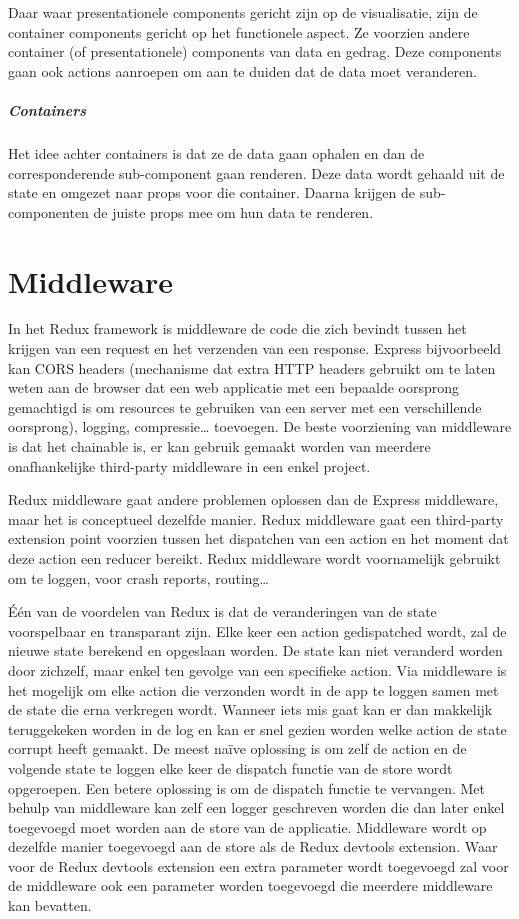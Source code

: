 Daar waar presentationele components gericht zijn op de visualisatie, zijn de container components gericht op het functionele aspect. Ze voorzien andere container (of presentationele) components van data en gedrag. Deze components gaan ook actions aanroepen om aan te duiden dat de data moet veranderen.  
\autocite{prescon}
\autocite{prescon2}

\subparagraph{Containers}
Het idee achter containers is dat ze de data gaan ophalen en dan de corresponderende sub-component gaan renderen. Deze data wordt gehaald uit de state en omgezet naar props voor die container. Daarna krijgen de sub-componenten de juiste props mee om hun data te renderen. 
\autocite{containercomp}

\section{Middleware}
In het Redux framework is middleware de code die zich bevindt tussen het krijgen van een request en het verzenden van een response. Express bijvoorbeeld kan CORS headers (mechanisme dat extra HTTP headers gebruikt om te laten weten aan de browser dat een web applicatie met een bepaalde oorsprong gemachtigd is om resources te gebruiken van een server met een verschillende oorsprong), logging, compressie… toevoegen. De beste voorziening van middleware is dat het chainable is, er kan gebruik gemaakt worden van meerdere onafhankelijke third-party middleware in een enkel project.
 
Redux middleware gaat andere problemen oplossen dan de Express middleware, maar het is conceptueel dezelfde manier. Redux middleware gaat een third-party extension point voorzien tussen het dispatchen van een action en het moment dat deze action een reducer bereikt. Redux middleware wordt voornamelijk gebruikt om te loggen, voor crash reports, routing…

Één van de voordelen van Redux is dat de veranderingen van de state voorspelbaar en transparant zijn. Elke keer een action gedispatched wordt, zal de nieuwe state berekend en opgeslaan worden. De state kan niet veranderd worden door zichzelf, maar enkel ten gevolge van een specifieke action. Via middleware is het mogelijk om elke action die verzonden wordt in de app te loggen samen met de state die erna verkregen wordt. Wanneer iets mis gaat kan er dan makkelijk teruggekeken worden in de log en kan er snel gezien worden welke action de state corrupt heeft gemaakt. De meest naïve oplossing is om zelf de action en de volgende state te loggen elke keer de dispatch functie van de store wordt opgeroepen. Een betere oplossing is om de dispatch functie te vervangen. Met behulp van middleware kan zelf een logger geschreven worden die dan later enkel toegevoegd moet worden aan de store van de applicatie. Middleware wordt op dezelfde manier toegevoegd aan de store als de Redux devtools extension. Waar voor de Redux devtools extension een extra parameter wordt toegevoegd zal voor de middleware ook een parameter worden toegevoegd die meerdere middleware kan bevatten. 
\autocite{Redux02}


